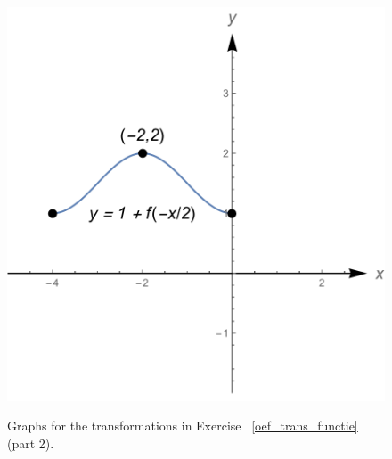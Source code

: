 \begin{Answer}
\begin{figure}[H]
{        \hspace{0.1cm}
        \includegraphics[scale=0.3]{fig_functions_oef_8m}
        }
        \caption{Graphs for the transformations in Exercise ~\ref{oef_trans_functie} (part 2).}
        \label{fig_oef_trans_functie_opl_deel2_NL}
    \end{figure}
\end{Answer}


\subsection*{}

